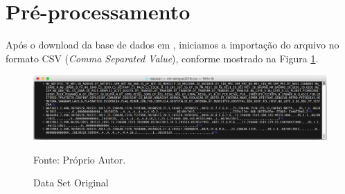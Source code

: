 \documentclass[
	12pt,				%
	openright,			%
	oneside,	
	a4paper,				%
	english,				%
	brazil				%
]{abntex2/abntex2} %
\begin{document}

	
	\section{Pré-processamento}
	\label{Pré-processamento}
	
	Após o download da base de dados em \cite{fortaleza:2015},  iniciamos a importação do arquivo no formato CSV (\textit{Comma Separated Value}), conforme mostrado na Figura \ref{figdataSetOriginal}.
	
		
		\begin{figure}[!htb]
			\caption{\label{figdataSetOriginal} Data Set Original}
			\begin{center}
				\includegraphics[scale=0.4]{img/dataSetOriginal.png}
			\end{center}
			Fonte: Próprio Autor.
		\end{figure}
	
\end{document}
